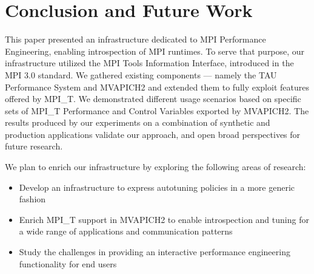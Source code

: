 \section{Conclusion and Future Work}

This paper presented an infrastructure dedicated to MPI Performance Engineering, enabling introspection of MPI runtimes.
To serve that purpose, our infrastructure utilized the MPI Tools Information Interface, introduced in the MPI 3.0 standard.
We gathered existing components --- namely the TAU Performance System and MVAPICH2 and extended them to fully exploit features offered by MPI\_T.
We demonstrated different usage scenarios based on specific sets of MPI\_T Performance and Control Variables exported by MVAPICH2.
The results produced by our experiments on a combination of synthetic and production applications validate our approach, and open broad perspectives for future research. \par
We plan to enrich our infrastructure by exploring the following areas of research:
\begin{itemize}
	\item Develop an infrastructure to express autotuning policies in a more generic fashion
        \item Enrich MPI\_T support in MVAPICH2 to enable introspection and tuning for a wide range of applications and communication patterns
	\item Study the challenges in providing an interactive performance engineering functionality for end users
\end{itemize}

